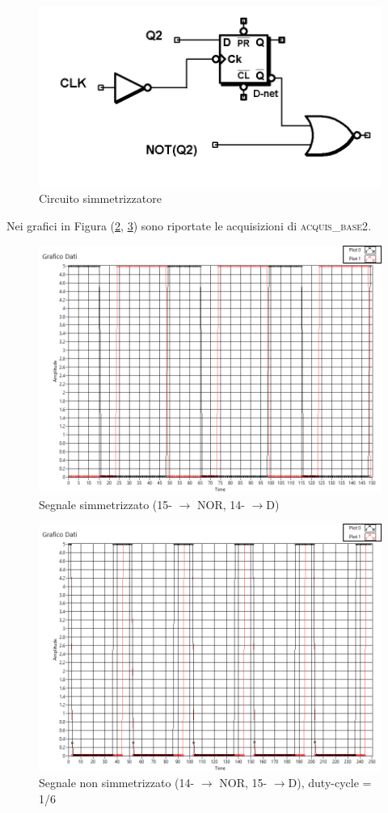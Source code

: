 \documentclass[journal, a4paper]{IEEEtran}
\begin{document}
\begin{figure}
\centering
\includegraphics[width=0.8\linewidth]{./es15_simmet}
\caption{Circuito simmetrizzatore}
\label{fig:es15_simmet}
\end{figure}

Nei grafici in Figura (\ref{fig:es9_simmetrizzatore_15nor_14d}, \ref{fig:es9_simmetrizzatore_14nor_15d}) sono riportate le acquisizioni di \textsc{acquis\_base2}.

\begin{figure}
\centering
\includegraphics[width=0.8\linewidth]{./es9_simmetrizzatore_15nor_14d.png}
\caption{Segnale simmetrizzato (15- $\rightarrow$ NOR, 14- $\rightarrow$D)}
\label{fig:es9_simmetrizzatore_15nor_14d}
\end{figure}

\begin{figure}
\centering
\includegraphics[width=0.8\linewidth]{./es9_simmetrizzatore_14nor_15d}
\caption{Segnale non simmetrizzato (14- $\rightarrow$ NOR, 15- $\rightarrow$D), duty-cycle = 1/6}
\label{fig:es9_simmetrizzatore_14nor_15d}
\end{figure}
\end{document}
